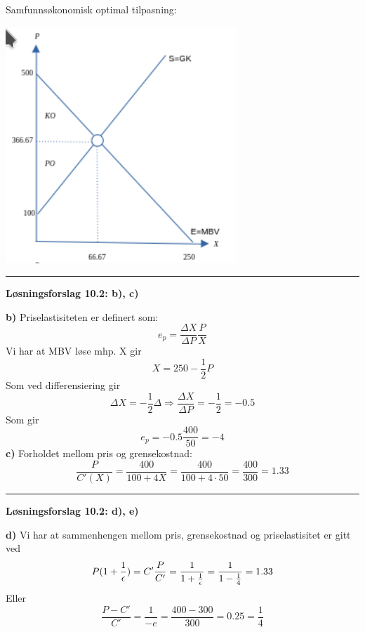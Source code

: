 \documentclass[
  letterpaper,
  DIV=11,
  numbers=noendperiod]{scrartcl}
\begin{document}
Samfunnsøkonomisk optimal tilpasning:

\includegraphics[width=0.65\textwidth,height=\textheight]{drawio/m_fk.png}

\begin{center}\rule{0.5\linewidth}{0.5pt}\end{center}

\textbf{Løsningsforslag 10.2: b), c) }

\textbf{b)} Priselastisiteten er definert som: \begin{equation*}
e_p = \frac{\Delta X}{\Delta P}\frac{P}{X}
\end{equation*} Vi har at MBV løse mhp. X gir \begin{equation*}
X=250-\frac{1}{2}P 
\end{equation*} Som ved differensiering gir \begin{equation*}
\Delta X=-\frac{1}{2}\Delta \Rightarrow \frac{\Delta X}{\Delta P} = -\frac{1}{2} = -0.5
\end{equation*} Som gir \begin{equation*}
e_p = -0.5\frac{400}{50} = -4
\end{equation*} \textbf{c)} Forholdet mellom pris og grensekostnad:
\begin{equation*}
\frac{P}{C'(X)}= \frac{400}{100+4X}=\frac{400}{100+4\cdot 50}=\frac{400}{300}=1.33
\end{equation*}

\begin{center}\rule{0.5\linewidth}{0.5pt}\end{center}

\textbf{Løsningsforslag 10.2: d), e) }

\textbf{d)} Vi har at sammenhengen mellom pris, grensekostnad og
priselastisitet er gitt ved \begin{equation*}
P(1+\frac{1}{\epsilon})=C' \\
\frac{P}{C'}=\frac{1}{1+\frac{1}{\epsilon}}=\frac{1}{1-\frac{1}{4}}=1.33
\end{equation*} Eller \begin{equation*}
\frac{P-C'}{C'}=\frac{1}{-e}=\frac{400-300}{300}=0.25=\frac{1}{4}
\end{equation*}
\end{document}
